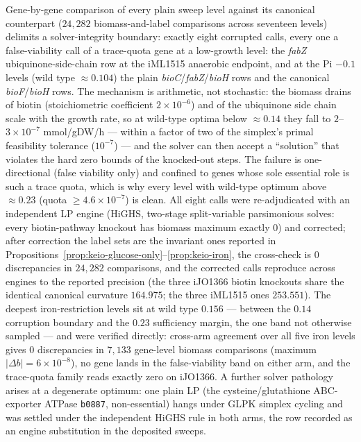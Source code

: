\documentclass[11pt,a4paper]{article}
\theoremstyle{plain}
\theoremstyle{definition}
\theoremstyle{remark}
\begin{document}
Gene-by-gene comparison of every plain sweep level against its
canonical counterpart ($24{,}282$
biomass-and-label comparisons across seventeen levels) delimits a
solver-integrity boundary: exactly eight corrupted calls, every one
a false-viability call of a trace-quota gene at a low-growth level:
the \emph{fabZ}
ubiquinone-side-chain row at the iML1515 anaerobic endpoint, and at
the $\mathrm{Pi}$ $-0.1$ levels (wild type $\approx 0.104$) the
plain \emph{bioC}/\emph{fabZ}/\emph{bioH} rows and the canonical
\emph{bioF}/\emph{bioH} rows. The mechanism is arithmetic, not
stochastic: the biomass drains of biotin (stoichiometric
coefficient $2\times10^{-6}$) and of the ubiquinone side chain
scale with the growth rate, so at wild-type optima below
$\approx 0.14$ they fall to $2$--$3\times10^{-7}$
mmol/gDW/h --- within a factor of two of the simplex's primal
feasibility tolerance ($10^{-7}$) --- and the solver can then
accept a ``solution'' that violates the hard zero bounds of the
knocked-out steps. The failure is one-directional (false viability
only) and confined to genes whose sole essential role is such a
trace quota, which is why every level with wild-type optimum above
$\approx 0.23$ (quota $\ge 4.6\times10^{-7}$) is clean. All eight
calls were re-adjudicated with an independent LP engine (HiGHS,
two-stage split-variable parsimonious solves: every biotin-pathway
knockout has biomass maximum exactly $0$) and corrected; after
correction the label sets are the invariant ones reported in
Propositions~\ref{prop:keio-glucose-only}--\ref{prop:keio-iron},
the cross-check is $0$ discrepancies in $24{,}282$ comparisons, and
the corrected calls reproduce across engines to the reported
precision (the three iJO1366 biotin knockouts share the identical
canonical curvature $164.975$; the three iML1515 ones $253.551$).
The deepest iron-restriction levels sit at wild type $0.156$ ---
between the $0.14$ corruption
boundary and the $0.23$ sufficiency margin, the one band not
otherwise sampled --- and were verified directly: cross-arm
agreement over all five iron levels gives $0$
discrepancies in $7{,}133$ gene-level biomass comparisons (maximum
$|{\Delta b}| = 6\times10^{-8}$), no gene lands in the
false-viability band on either arm, and the trace-quota family
reads exactly zero on iJO1366. A
further solver pathology arises at a degenerate optimum: one plain
LP (the
cysteine/glutathione ABC-exporter ATPase \texttt{b0887},
non-essential) hangs under GLPK simplex cycling and was settled
under the independent HiGHS rule in both arms, the row recorded
as an engine substitution in the deposited sweeps.
\end{document}
